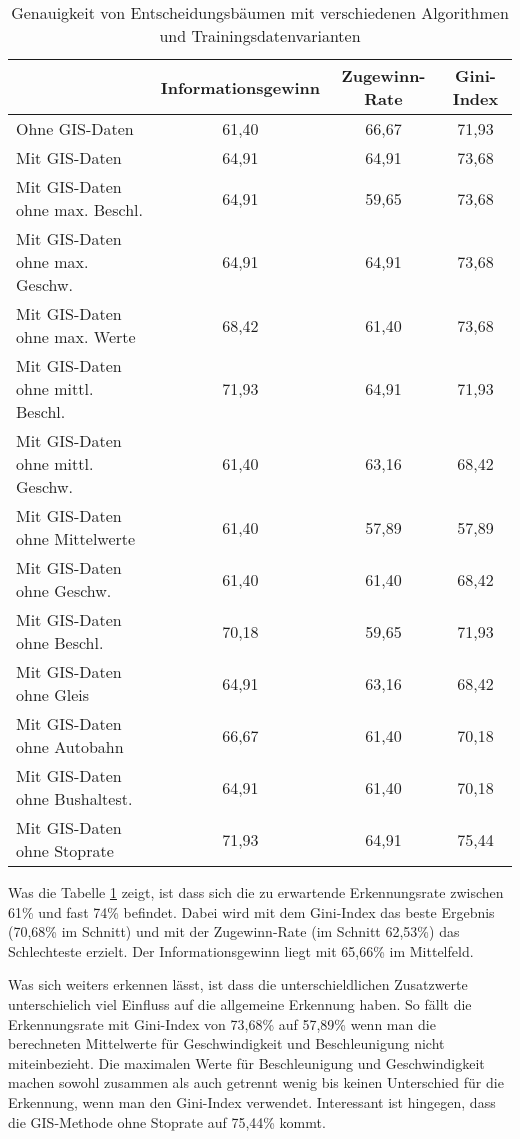 \begin{table}[h]
\centering
\begin{tabular}{|l|c|c|c|}
\hline
 & {\bf Informationsgewinn} & {\bf Zugewinn-Rate} & {\bf Gini-Index} \\ \hline
Ohne GIS-Daten & 61,40 & 66,67 & 71,93 \\ \hline
Mit GIS-Daten & 64,91 & 64,91 & 73,68 \\ \hline
Mit GIS-Daten ohne max. Beschl. & 64,91 & 59,65 & 73,68 \\ \hline
Mit GIS-Daten ohne max. Geschw. & 64,91 & 64,91 & 73,68 \\ \hline
Mit GIS-Daten ohne max. Werte & 68,42 & 61,40 & 73,68 \\ \hline
Mit GIS-Daten ohne mittl. Beschl. & 71,93 & 64,91 & 71,93 \\ \hline
Mit GIS-Daten ohne mittl. Geschw. & 61,40 & 63,16 & 68,42 \\ \hline
Mit GIS-Daten ohne Mittelwerte & 61,40 & 57,89 & 57,89 \\ \hline
Mit GIS-Daten ohne Geschw. & 61,40 & 61,40 & 68,42 \\ \hline
Mit GIS-Daten ohne Beschl. & 70,18 & 59,65 & 71,93 \\ \hline
Mit GIS-Daten ohne Gleis & 64,91 & 63,16 & 68,42 \\ \hline
Mit GIS-Daten ohne Autobahn & 66,67 & 61,40 & 70,18 \\ \hline
Mit GIS-Daten ohne Bushaltest. & 64,91 & 61,40 & 70,18 \\ \hline
Mit GIS-Daten ohne Stoprate & 71,93 & 64,91 & 75,44 \\ \hline
\end{tabular}
\caption{Genauigkeit von Entscheidungsbäumen mit verschiedenen Algorithmen und Trainingsdatenvarianten}
\label{dt-calculation-methods}
\end{table}

Was die Tabelle \ref{dt-calculation-methods} zeigt, ist dass sich die zu erwartende Erkennungsrate zwischen 61\% und fast 74\% befindet. Dabei wird mit dem Gini-Index das beste Ergebnis (70,68\% im Schnitt) und mit der Zugewinn-Rate (im Schnitt 62,53\%) das Schlechteste erzielt. Der Informationsgewinn liegt mit 65,66\% im Mittelfeld.

Was sich weiters erkennen lässt, ist dass die unterschieldlichen Zusatzwerte unterschielich viel Einfluss auf die allgemeine Erkennung haben. So fällt die Erkennungsrate mit Gini-Index von 73,68\% auf 57,89\% wenn man die berechneten Mittelwerte für Geschwindigkeit und Beschleunigung nicht miteinbezieht. Die maximalen Werte für Beschleunigung und Geschwindigkeit machen sowohl zusammen als auch getrennt wenig bis keinen Unterschied für die Erkennung,  wenn man den Gini-Index verwendet. Interessant ist hingegen, dass die GIS-Methode ohne Stoprate auf 75,44\% kommt.

